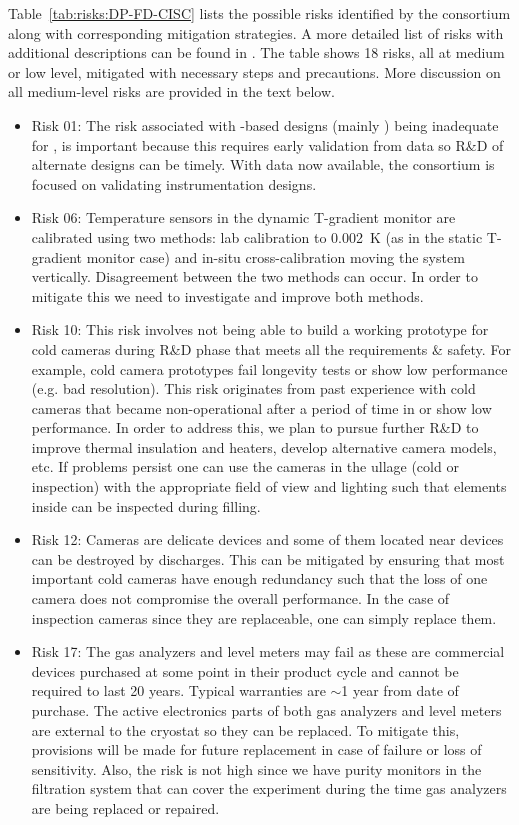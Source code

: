 Table~\ref{tab:risks:DP-FD-CISC} lists the possible risks identified by the  consortium along with corresponding mitigation strategies. 
A more detailed list of risks with additional descriptions can be found in \cite{bib:docdb7192}. The table shows 18 risks, all at medium or low level, mitigated with necessary steps and precautions. More discussion on all medium-level risks are provided in the text below. 
\begin{itemize}
    \item Risk 01: The risk associated with -based designs (mainly ) being inadequate for , is important because this requires early validation from  data so R\&D of alternate designs can be timely. With  data now available, the consortium is focused on validating instrumentation designs.
    \item Risk 06: Temperature sensors in the dynamic T-gradient monitor are calibrated using two methods: lab calibration to 0.002~K (as in the static T-gradient monitor case) and in-situ cross-calibration moving the system vertically. Disagreement between the two methods can occur. In order to mitigate this we need to investigate and improve both methods. 
    \item Risk 10: This risk involves not being able to build a working prototype for cold cameras during R\&D phase that meets all the requirements \& safety. For example, cold camera prototypes fail longevity tests or show low performance (e.g. bad resolution). This risk originates from past experience with cold cameras that became non-operational after a period of time in  or show low performance. In order to address this, we plan to pursue further R\&D to improve thermal insulation and heaters, develop alternative camera models, etc. If problems persist one can use the cameras in the ullage (cold or inspection) with the appropriate field of view and lighting such that elements inside  can be inspected during filling.
    \item Risk 12: Cameras are delicate devices and some of them located near  devices can be destroyed by  discharges. This can be mitigated by ensuring that most important cold cameras have enough redundancy such that the loss of one camera does not compromise the overall performance. In the case of inspection cameras since they are replaceable, one can simply replace them.
    \item Risk 17: The gas analyzers and level meters may fail as these are commercial devices purchased at some point in their product cycle and cannot be required to last 20 years. Typical warranties are $\sim$1 year from date of purchase. The active electronics parts of both gas analyzers and level meters are external to the cryostat so they can be replaced. To mitigate this, provisions will be made for future replacement in case of failure or loss of sensitivity. Also, the risk is not high since we have purity monitors in the filtration system that can cover the experiment during the time gas analyzers are being replaced or repaired. 
\end{itemize}

